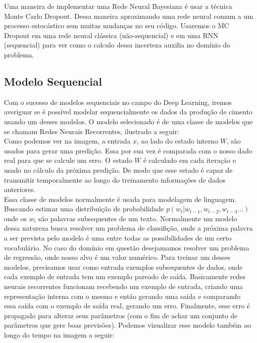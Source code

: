 Uma maneira de implementar uma Rede Neural Bayesiana é usar a técnica Monte Carlo Dropout. Dessa maneira aproximando uma rede neural comum a um processo estocástico sem muitas mudanças no seu código. Usaremos o MC Dropout em uma rede neural clássica (não-sequencial) e em uma RNN (sequencial) para ver como o calculo dessa incerteza auxilia no domínio do problema.

\subsection{Modelo Sequencial}
Com o sucesso de modelos sequenciais no campo do Deep Learning, iremos averiguar se é possível modelar sequencialmente os dados da produção de cimento usando um desses modelos. O modelo selecionado é de uma classe de modelos que se chamam Redes Neurais Recorrentes, ilustrado a seguir:
\\


% 

Como podemos ver na imagem, a entrada $x$, ao lado do estado interno $W$, são usados para gerar uma predição. Essa por sua vez é comparada com o nosso dado real para que se calcule um erro. O estado $W$ é calculado em cada iteração e usado no cálculo da próxima predição. De modo que esse estado é capaz de transmitir temporalmente ao longo do treinamento informações de dados anteriores.
\\

Essa classe de modelos normalmente é usada para modelagem de linguagem. Buscando estimar uma distribuição de probabilidade $p(w_t | w_{t-1},w_{t-2},w_{t-3} \dots ) $ onde os $w_i$ são palavras subsequentes de um texto. Normalmente um modelo dessa natureza busca resolver um problema de classifição, onde a próxima palavra a ser prevista pelo modelo é uma entre todas as possibilidades de um certo vocabulário. No caso do domínio em questão desejamamos resolver um problema de regressão, onde nosso alvo é um valor numérico. Para treinar um desses modelos, precisamos usar como entrada exemplos subsequentes de dados, onde cada exemplo de entrada tem um exemplo pareado de saída. Basicamente redes neurais recorrentes funcionam recebendo um exemplo de entrada, criando uma representação interna com o mesmo e então gerando uma saída e comparando essa saída com o exemplo de saída real, gerando um erro. Finalmente, esse erro é propagado para alterar seus parâmetros (com o fim de achar um conjunto de parâmetros que gere boas previsões). Podemos vizualizar esse modelo também ao longo do tempo na imagem a seguir:


